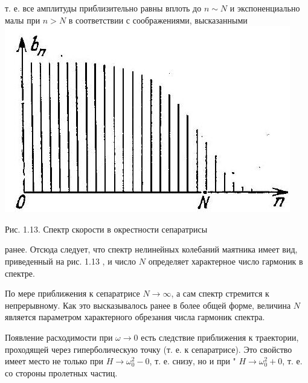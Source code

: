 \documentclass[10pt]{article}
\begin{document}
т. е. все амплитуды приблизительно равны вплоть до $n \sim N$ и экспоненциально малы при $n>N$ в соответствии с соображениями, высказанными\\
\includegraphics[max width=\textwidth, center]{2024_12_13_2abbd56e24043f80c30dg-5}

Рис. 1.13. Спектр скорости в окрестности сепаратрисы

ранее. Отсюда следует, что спектр нелинейных колебаний маятника имеет вид, приведенный на рис. 1.13 , и число $N$ определяет характерное число гармоник в спектре.

По мере приближения к сепаратрисе $N \rightarrow \infty$, а сам спектр стремится к непрерывному. Как это высказывалось ранее в более общей форме, величина $N$ является параметром характерного обрезания числа гармоник спектра.

Появление расходимости при $\omega \longrightarrow 0$ есть следствие приближения к траектории, проходящей через гиперболическую точку (т. е. к сепаратрисе). Это свойство имеет место не только при $H \rightarrow \omega_{0}^{2}-0$, т. е. снизу, но и при " $H \rightarrow \omega_{0}^{2}+0$, т. е. со стороны пролетных частиц.
\end{document}
